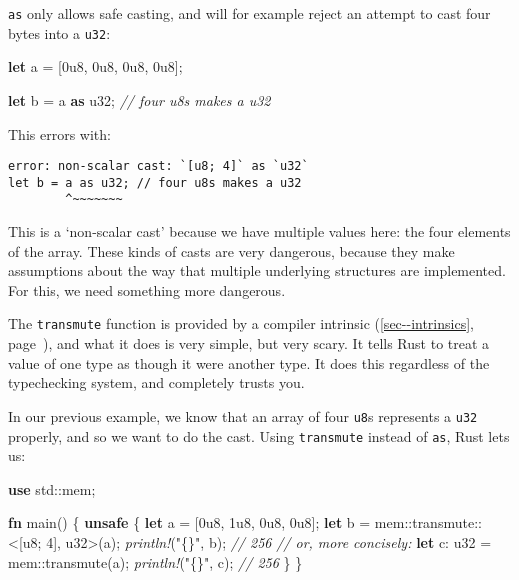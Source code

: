 \documentclass[a4paper,]{book}
\renewcommand*{\hyperlink}[2]{%
 #2 (\autoref{#1}, page~\pageref{#1})}
\newenvironment{Shaded}{\begin{snugshade}}{\end{snugshade}}
\newcommand{\KeywordTok}[1]{\textcolor[rgb]{0.13,0.29,0.53}{\textbf{{#1}}}}
\newcommand{\DataTypeTok}[1]{\textcolor[rgb]{0.13,0.29,0.53}{{#1}}}
\newcommand{\DecValTok}[1]{\textcolor[rgb]{0.00,0.00,0.81}{{#1}}}
\newcommand{\StringTok}[1]{\textcolor[rgb]{0.31,0.60,0.02}{{#1}}}
\newcommand{\CommentTok}[1]{\textcolor[rgb]{0.56,0.35,0.01}{\textit{{#1}}}}
\newcommand{\PreprocessorTok}[1]{\textcolor[rgb]{0.56,0.35,0.01}{\textit{{#1}}}}
\newcommand{\NormalTok}[1]{{#1}}
\begin{document}
\texttt{as} only allows safe casting, and will for example reject an
attempt to cast four bytes into a \texttt{u32}:

\begin{Shaded}
\begin{Highlighting}[]
\KeywordTok{let} \NormalTok{a = [}\DecValTok{0u8}\NormalTok{, }\DecValTok{0u8}\NormalTok{, }\DecValTok{0u8}\NormalTok{, }\DecValTok{0u8}\NormalTok{];}

\KeywordTok{let} \NormalTok{b = a }\KeywordTok{as} \DataTypeTok{u32}\NormalTok{; }\CommentTok{// four u8s makes a u32}
\end{Highlighting}
\end{Shaded}

This errors with:

\begin{verbatim}
error: non-scalar cast: `[u8; 4]` as `u32`
let b = a as u32; // four u8s makes a u32
        ^~~~~~~~
\end{verbatim}

This is a `non-scalar cast' because we have multiple values here: the
four elements of the array. These kinds of casts are very dangerous,
because they make assumptions about the way that multiple underlying
structures are implemented. For this, we need something more dangerous.

The \texttt{transmute} function is provided by a
\protect\hyperlink{sec--intrinsics}{compiler intrinsic}, and what it
does is very simple, but very scary. It tells Rust to treat a value of
one type as though it were another type. It does this regardless of the
typechecking system, and completely trusts you.

In our previous example, we know that an array of four \texttt{u8}s
represents a \texttt{u32} properly, and so we want to do the cast. Using
\texttt{transmute} instead of \texttt{as}, Rust lets us:

\begin{Shaded}
\begin{Highlighting}[]
\KeywordTok{use} \NormalTok{std::mem;}

\KeywordTok{fn} \NormalTok{main() \{}
    \KeywordTok{unsafe} \NormalTok{\{}
        \KeywordTok{let} \NormalTok{a = [}\DecValTok{0u8}\NormalTok{, }\DecValTok{1u8}\NormalTok{, }\DecValTok{0u8}\NormalTok{, }\DecValTok{0u8}\NormalTok{];}
        \KeywordTok{let} \NormalTok{b = mem::transmute::<[}\DataTypeTok{u8}\NormalTok{; }\DecValTok{4}\NormalTok{], }\DataTypeTok{u32}\NormalTok{>(a);}
        \PreprocessorTok{println!}\NormalTok{(}\StringTok{"\{\}"}\NormalTok{, b); }\CommentTok{// 256}
        \CommentTok{// or, more concisely:}
        \KeywordTok{let} \NormalTok{c: }\DataTypeTok{u32} \NormalTok{= mem::transmute(a);}
        \PreprocessorTok{println!}\NormalTok{(}\StringTok{"\{\}"}\NormalTok{, c); }\CommentTok{// 256}
    \NormalTok{\}}
\NormalTok{\}}
\end{Highlighting}
\end{Shaded}
\end{document}
